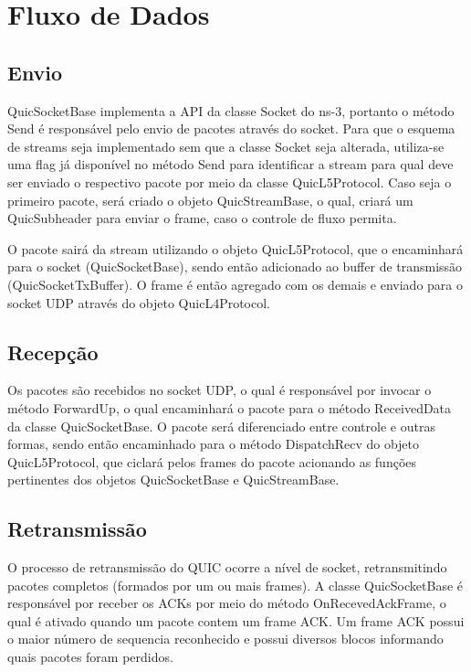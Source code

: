 \documentclass{article}
\begin{document}
\section{Fluxo de Dados}

\subsection{Envio}

QuicSocketBase implementa a API da classe Socket do ns-3, portanto o método Send é responsável pelo envio de pacotes
através do socket. Para que o esquema de streams seja implementado sem que a classe Socket seja alterada, utiliza-se uma
flag já disponível no método Send para identificar a stream para qual deve ser enviado o respectivo pacote por meio da
classe QuicL5Protocol. Caso seja o primeiro pacote, será criado o objeto QuicStreamBase, o qual, criará um QuicSubheader
para enviar o frame, caso o controle de fluxo permita.

O pacote sairá da stream utilizando o objeto QuicL5Protocol, que o encaminhará para o socket (QuicSocketBase), sendo
então adicionado ao buffer de transmissão (QuicSocketTxBuffer). O frame é então agregado com os demais e enviado para o
socket UDP através do objeto QuicL4Protocol.

\subsection{Recepção}
Os pacotes são recebidos no socket UDP, o qual é responsável por invocar o método ForwardUp, o qual encaminhará o pacote
para o método ReceivedData da classe QuicSocketBase. O pacote será diferenciado entre controle e outras formas, sendo
então encaminhado para o método DispatchRecv do objeto QuicL5Protocol, que ciclará pelos frames do pacote acionando as
funções pertinentes dos objetos QuicSocketBase e QuicStreamBase.

\subsection{Retransmissão}
O processo de retransmissão do QUIC ocorre a nível de socket, retransmitindo pacotes completos (formados por um ou mais
frames). A classe QuicSocketBase é responsável por receber os ACKs por meio do método OnRecevedAckFrame, o qual é
ativado quando um pacote contem um frame ACK. Um frame ACK possui o maior número de sequencia reconhecido e possui
diversos blocos informando quais pacotes foram perdidos. 
\end{document}
